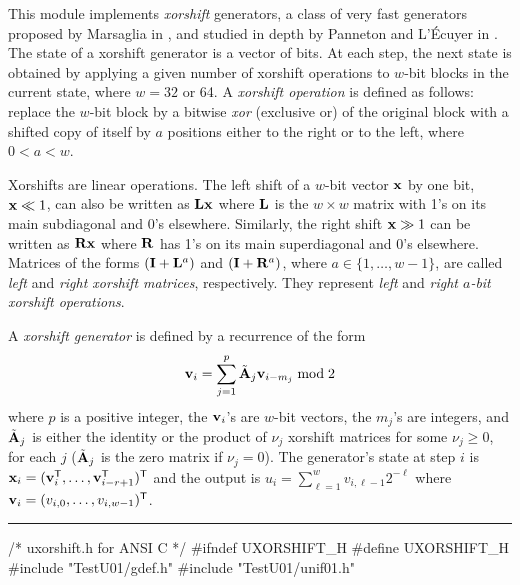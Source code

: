 
\def\OP{\mathop {H}\nolimits}

This module implements \emph{xorshift} generators, a class of very fast
 generators proposed by Marsaglia in \cite{rMAR03a}, and studied
in depth by Panneton and L'\'Ecuyer in  \cite{rPAN04c}.
The state of a xorshift generator is a vector of bits. At each
step, the next state is obtained by applying a given number of
xorshift operations to $w$-bit blocks in the current state, where
$w=32$ or 64. A \emph{xorshift operation} is defined as
follows: replace the $w$-bit block by a bitwise \emph{xor} (exclusive or)
of the original block with a shifted copy of itself by $a$ positions
either to the right or to the left, where $0 < a < w$.

Xorshifts are linear operations.
The left shift of a $w$-bit vector ${\bf x}$ by one bit, ${\bf x} \ll 1$,
can also be written as ${\bf L}{\bf x}$ where ${\bf L}$ is the $w\times w$ matrix
with 1's on its main subdiagonal and 0's elsewhere.
Similarly, the right shift ${\bf x} \gg 1$ can be written as ${\bf R}{\bf x}$
where ${\bf R}$ has 1's on its main superdiagonal and 0's elsewhere.
Matrices of the forms $({\bf I}+{\bf L}^{a})$ and $({\bf I}+{\bf R}^{a})$,
where $a \in \{1,\dots,w-1\}$, are called
\emph{left} and \emph{right xorshift matrices}, respectively.
They represent \emph{left} and \emph{right $a$-bit xorshift operations}.


A \emph{xorshift generator} is defined by a recurrence of the form
\begin{equation}
\label{eq:MRMMprime}
 {\bf v}_i = \sum_{j=1}^p \tilde{{\bf A}}_j {\bf v}_{i-m_j} \bmod 2
\end{equation}
where $p$ is a positive integer, the ${\bf v}_i$'s are $w$-bit vectors,
the $m_j$'s are integers,
and $\tilde{{\bf A}}_j$ is either the identity or the product of
$\nu_j$ xorshift matrices for some $\nu_j\ge 0$,
for each $j$ ($\tilde{{\bf A}}_j$ is the zero matrix if $\nu_j = 0$).
The generator's state at step $i$ is
${\bf x}_i = ({\bf v}_i^{\sf T},\ldots,{\bf v}_{i-r+1}^{\sf T})^{\sf T}$ and
the output is $u_i = \sum_{\ell=1}^w v_{i,\ell-1} 2^{-\ell}$
where ${\bf v}_i = (v_{i,0},\dots,v_{i,w-1})^{\sf T}$.

\bigskip
\hrule
\code
\hide
/*  uxorshift.h  for ANSI C */
#ifndef UXORSHIFT_H
#define UXORSHIFT_H
\endhide
#include "TestU01/gdef.h"
#include "TestU01/unif01.h"


